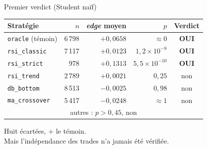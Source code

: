 \documentclass[10pt]{beamer}
\newcommand{\edge}{\textit{edge}}
\newcommand{\oui}{\textcolor{vertok}{\textbf{OUI}}}
\newcommand{\non}{\textcolor{rougeko}{non}}
\begin{document}
\begin{frame}{Premier verdict (Student naïf)}
  \begin{center}
  \small
  \begin{tabular}{@{}lrrrc@{}}
    \toprule
    Stratégie & $n$ & \edge{} moyen & $p$ & Verdict \\
    \midrule
    \texttt{oracle} (témoin) & 6\,798 & $+0{,}0658$ & $\approx 0$ & \oui \\
    \midrule
    \texttt{rsi\_classic} & 7\,117 & $+0{,}0123$ & $1{,}2\times10^{-8}$  & \oui \\
    \texttt{rsi\_strict}  &   978  & $+0{,}1313$ & $5{,}5\times10^{-10}$ & \oui \\
    \texttt{rsi\_trend}   & 2\,789 & $+0{,}0021$ & $0{,}25$ & \non \\
    \texttt{db\_bottom}   & 8\,513 & $-0{,}0025$ & $0{,}98$ & \non \\
    \texttt{ma\_crossover}& 5\,417 & $-0{,}0248$ & $\approx 1$ & \non \\
    \multicolumn{5}{c}{\scriptsize autres : $p > 0{,}45$, \non} \\
    \bottomrule
  \end{tabular}
  \end{center}
  \vspace{4mm}
  \begin{center}
    Huit écartées,  $+$ le témoin.\\[2mm]
    \alert{Mais l'indépendance des trades n'a jamais été vérifiée.}
  \end{center}
\end{frame}
\end{document}
